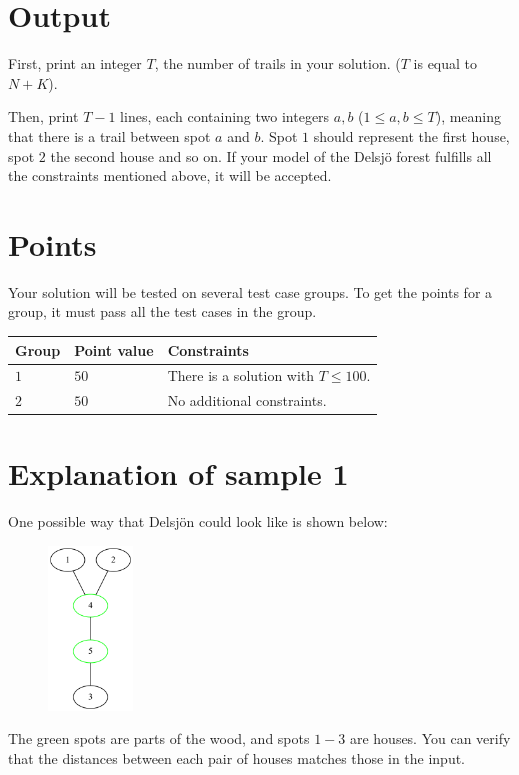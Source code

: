\section*{Output}
First, print an integer $T$, the number of trails in your solution. ($T$ is equal to $N+K$).

Then, print $T-1$ lines, each containing two integers $a,b$ ($1 \leq a,b \leq T$), meaning that there
is a trail between spot $a$ and $b$. Spot $1$ should represent the first house, spot $2$ the second house and so on.
If your model of the Delsjö forest fulfills all the constraints mentioned above, it will be accepted.


\section*{Points}
Your solution will be tested on several test case groups. To get the points for
a group, it must pass all the test cases in the group.

\noindent
\begin{tabular}{| l | l | p{12cm} |}
  \hline
  \textbf{Group} & \textbf{Point value} & \textbf{Constraints} \\ \hline
  $1$    & $50$       & There is a solution with $T \leq 100$. \\ \hline
  $2$    & $50$       & No additional constraints. \\ \hline
\end{tabular}

\section*{Explanation of sample 1}
One possible way that Delsjön could look like is shown below: 
\begin{center}
  \begin{figure}[h]
    \centering
    \includegraphics[width=0.2\textwidth]{sample-1.png}
  \end{figure}
\end{center}
The green spots are parts of the wood, and spots $1-3$ are houses. You can verify that the distances 
between each pair of houses matches those in the input.

